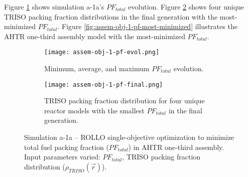 Figure \ref{fig:assem-obj-1-pf-evol} shows simulation a-1a's $PF_{total}$ evolution.
Figure \ref{fig:assem-obj-1-pf-final} shows four unique TRISO packing fraction 
distributions in the final generation with the most-minimized $PF_{total}$. 
Figure \ref{fig:assem-obj-1-pf-most-minimized} illustrates the \gls{AHTR} one-third 
assembly model with the most-minimized $PF_{total}$.
\begin{figure}[htbp!]
    \begin{subfigure}{\textwidth}
        \centering
        \texttt{[image: assem-obj-1-pf-evol.png]}
        \caption{Minimum, average, and maximum $PF_{total}$ evolution.}
        \label{fig:assem-obj-1-pf-evol} 
    \end{subfigure}
    \begin{subfigure}{\textwidth}
        \centering
        \texttt{[image: assem-obj-1-pf-final.png]}
        \caption{TRISO packing fraction distribution for four unique reactor models with the 
        smallest $PF_{total}$ in the final generation.}
        \label{fig:assem-obj-1-pf-final} 
    \end{subfigure}
    \caption{Simulation a-1a -- ROLLO single-objective optimization to minimize total 
    fuel packing fraction ($PF_{total}$) in \gls{AHTR} one-third assembly. 
    Input parameters varied: $PF_{total}$, \gls{TRISO} packing fraction 
    distribution ($\rho_{TRISO}(\vec{r})$).}
    \label{fig:assem-obj-1-pf}
\end{figure}
